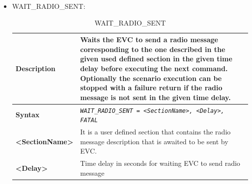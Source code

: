 \begin{itemize}
\begin{longtable}{|l|l|l|}
				\hline \hline

			\end{longtable}

		\item WAIT\_RADIO\_SENT:



			\begin{longtable}{|l|l|l|}
				\caption{WAIT\_RADIO\_SENT}\\
				\hline

					\begin{minipage}[t]{0.22\linewidth} \textbf{Description} \end{minipage}
				&	\begin{minipage}[t]{0.78\linewidth} Waits the EVC to send a radio message corresponding to the one described in the given used defined section in the given time delay before executing the next command. Optionally the scenario execution can be stopped with a failure return if the radio message is not sent in the given time delay. \end{minipage} \\

				\hline

					\begin{minipage}[t]{0.22\linewidth} \textbf{Syntax}	\end{minipage}
				&	\multicolumn{2}{l|}{ \begin{minipage}[t]{0.78\linewidth} \emph{\texttt{WAIT\_RADIO\_SENT = <SectionName>, <Delay>, FATAL}} \end{minipage} } \\

				\hline

					\begin{minipage}[t]{0.22\linewidth} \textbf{<SectionName>} \end{minipage}
				&	\multicolumn{2}{l|}{ \begin{minipage}[t]{0.78\linewidth} It is a user defined section that contains the radio message description that is awaited to be sent by EVC. \end{minipage} } \\

				\hline

					\begin{minipage}[t]{0.22\linewidth} \textbf{<Delay>} \end{minipage}
				&	\multicolumn{2}{l|}{	\begin{minipage}[t]{0.78\linewidth}	Time delay in seconds for waiting EVC to send radio message	\end{minipage} } \\


\end{longtable}
\end{itemize}

